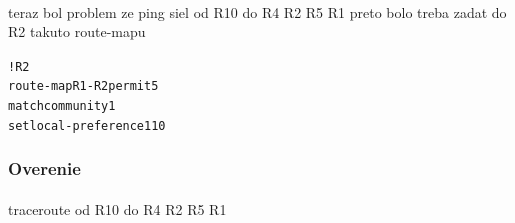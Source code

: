 \documentclass[12pt,twoside,a4paper]{report}
\begin{document}
\paragraph{}
teraz bol problem ze ping siel od R10 do R4 R2 R5 R1
preto bolo treba zadat do R2 takuto route-mapu

\noindent
{\selectfont
\begin{small}
\begin{alltt}
!R2
route-map R1-R2 permit 5
 match community 1
 set local-preference 110
\end{alltt}
\end{small}
}

\subsubsection{Overenie}
\paragraph{}
traceroute od R10 do R4 R2 R5 R1
\end{document}
